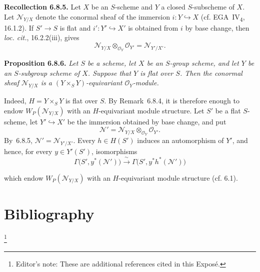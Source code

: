 \medskip
\noindent\textbf{Recollection 6.8.5.}
Let \(X\) be an \(S\)-scheme and \(Y\) a closed \(S\)-subscheme of
\(X\). Let \(\mathcal N_{Y/X}\) denote the conormal sheaf of the
immersion \(i:Y\hookrightarrow X\) (cf. EGA~IV\textsubscript{4},
16.1.2). If \(S'\to S\) is flat and
\(i':Y'\hookrightarrow X'\) is obtained from \(i\) by base change,
then \emph{loc. cit.}, 16.2.2(iii), gives
\[
  \mathcal N_{Y/X}\otimes_{\mathcal O_Y}\mathcal O_{Y'}
  =\mathcal N_{Y'/X'}.
\]

\medskip
\noindent\textbf{Proposition 6.8.6.}
\textit{Let \(S\) be a scheme, let \(X\) be an \(S\)-group scheme, and
let \(Y\) be an \(S\)-subgroup scheme of \(X\). Suppose that \(Y\) is
flat over \(S\). Then the conormal sheaf \(\mathcal N_{Y/X}\) is a
\((Y\times_SY)\)-equivariant \(\mathcal O_Y\)-module.}

Indeed, \(H=Y\times_SY\) is flat over \(S\). By Remark~6.8.4, it is
therefore enough to endow \(W_P(\mathcal N_{Y/X})\) with an
\(H\)-equivariant module structure. Let \(S'\) be a flat \(S\)-scheme,
let \(Y'\hookrightarrow X'\) be the immersion obtained by base change,
and put
\[
  \mathcal N'
  =\mathcal N_{Y/X}\otimes_{\mathcal O_Y}\mathcal O_{Y'}.
\]
By~6.8.5, \(\mathcal N'=\mathcal N_{Y'/X'}\).
Every \(h\in H(S')\) induces an automorphism of \(Y'\), and hence, for
every \(y\in Y'(S')\), isomorphisms
\[
  \Gamma\bigl(S',y^*(\mathcal N')\bigr)
  \xrightarrow{\ \sim\ }
  \Gamma\bigl(S',y^*h^*(\mathcal N')\bigr)
\]

which endow \(W_P(\mathcal N_{Y/X})\) with an \(H\)-equivariant module
structure (cf. 6.1).

\section*{Bibliography}
\footnote{Editor's note: These are additional references cited in this
Expos\'e.}

